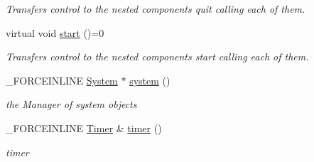 \begin{DoxyCompactItemize}
\begin{DoxyCompactList}\small\item\em Transfers control to the nested components quit calling each of them. \end{DoxyCompactList}\item 
\hypertarget{classcsad_1_1_core_a5a91731a8393443e70107d01cc1251f4}{virtual void \hyperlink{classcsad_1_1_core_a5a91731a8393443e70107d01cc1251f4}{start} ()=0}\label{classcsad_1_1_core_a5a91731a8393443e70107d01cc1251f4}

\begin{DoxyCompactList}\small\item\em Transfers control to the nested components start calling each of them. \end{DoxyCompactList}\item 
\hypertarget{classcsad_1_1_core_aca7459f5c5bd54d7e27841add759bfac}{\-\_\-\-F\-O\-R\-C\-E\-I\-N\-L\-I\-N\-E \hyperlink{classcsad_1_1_system}{System} $\ast$ \hyperlink{classcsad_1_1_core_aca7459f5c5bd54d7e27841add759bfac}{system} ()}\label{classcsad_1_1_core_aca7459f5c5bd54d7e27841add759bfac}

\begin{DoxyCompactList}\small\item\em the Manager of system objects \end{DoxyCompactList}\item 
\hypertarget{classcsad_1_1_core_ac2f2c39bca8736c4fb0888b64e496971}{\-\_\-\-F\-O\-R\-C\-E\-I\-N\-L\-I\-N\-E \hyperlink{classcsad_1_1_timer}{Timer} \& \hyperlink{classcsad_1_1_core_ac2f2c39bca8736c4fb0888b64e496971}{timer} ()}\label{classcsad_1_1_core_ac2f2c39bca8736c4fb0888b64e496971}

\begin{DoxyCompactList}\small\item\em timer \end{DoxyCompactList}\end{DoxyCompactItemize}
